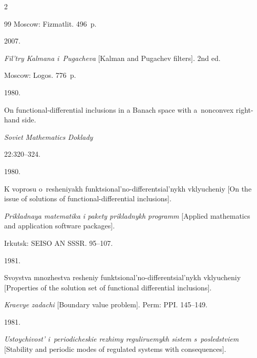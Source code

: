 \begin{multicols}{2}
{{\begin{thebibliography}{99}
Moscow: Fizmatlit. 496~p.





 2007. 

\textit{Fil'try Kalmana i~Pugacheva} [Kalman and Pugachev filters]. 2nd ed. 

Moscow: Logos. 776~p.





 1980.

On functional-differential inclusions in a Banach space with a~nonconvex right-hand side. 

\textit{Soviet Mathematics Doklady} 

22:320--324.





 1980.

K voprosu o~resheniyakh funktsional'no-differentsial'nykh  vklyucheniy [On the issue of solutions of functional-differential inclusions].

\textit{Prikladnaya matematika i pakety prikladnykh programm} [Applied mathematics and application software packages]. 

Irkutsk: SEISO AN SSSR. 95--107.





 1981. 

Svoystva mnozhestva resheniy funktsional'no-differentsial'nykh vklyucheniy [Properties of the solution set of functional differential inclusions]. 

\textit{Kraevye zadachi} [Boundary value problem]. Perm: PPI. 145--149.









 1981.

\textit{Ustoychivost' i~periodicheskie rezhimy reguliruemykh sistem s~posledstviem} [Stability and periodic modes of regulated systems with consequences]. 


\end{thebibliography}}}
\end{multicols}
